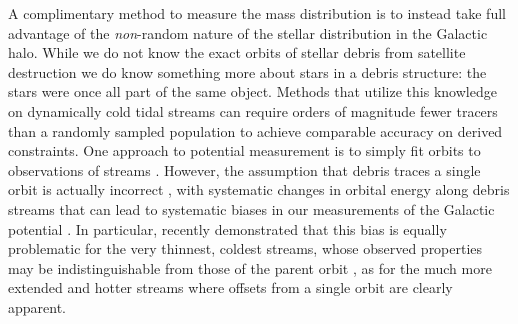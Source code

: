 \documentclass{emulateapj}
\begin{document}
A complimentary method to measure the mass distribution is to instead take full advantage of the {\it non}-random nature of the stellar distribution in the Galactic halo.
While we do not know the exact orbits of  stellar debris from satellite destruction 
we do know something more about stars in a debris structure: the stars were once all part of the same object.
Methods that utilize this knowledge on dynamically cold  tidal streams can require orders of magnitude fewer tracers than a randomly sampled population to achieve comparable accuracy on derived constraints.
One approach to potential measurement is to simply fit orbits to observations of streams 
\citep[e.g.,][]{koposov10}.
However, the assumption that debris traces a single orbit is actually incorrect \citep[see][for discussions of the orbit distribution in tidal debris]{johnston98,helmi99}, with
systematic changes in orbital energy along debris streams that can lead to systematic biases in our measurements of the Galactic potential \citep{eyre09a,varghese11}.
In particular, \citet{sanders13a} recently demonstrated that this bias is equally problematic for the very thinnest, coldest streams, whose observed properties may be indistinguishable from those of the parent orbit \citep[e.g. such as the globular cluster, GD1 --- see][]{koposov10}, as for the much more extended and hotter streams \citep[e.g. such as debris from the Sagittarius dwarf galaxy --- see][]{majewski03} where offsets from a single orbit are clearly apparent.
\end{document}
